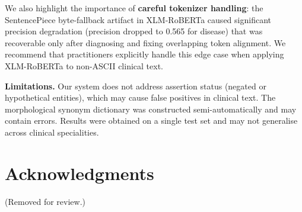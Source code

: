 \documentclass[11pt]{article}
\begin{document}
We also highlight the importance of \textbf{careful tokenizer handling}: the SentencePiece
byte-fallback artifact in XLM-RoBERTa caused significant precision degradation (precision
dropped to 0.565 for disease) that was recoverable only after diagnosing and fixing
overlapping token alignment. We recommend that practitioners explicitly handle this edge
case when applying XLM-RoBERTa to non-ASCII clinical text.

\textbf{Limitations.} Our system does not address assertion status (negated or hypothetical
entities), which may cause false positives in clinical text. The morphological synonym
dictionary was constructed semi-automatically and may contain errors. Results were
obtained on a single test set and may not generalise across clinical specialities.

\section*{Acknowledgments}
(Removed for review.)


\end{document}
